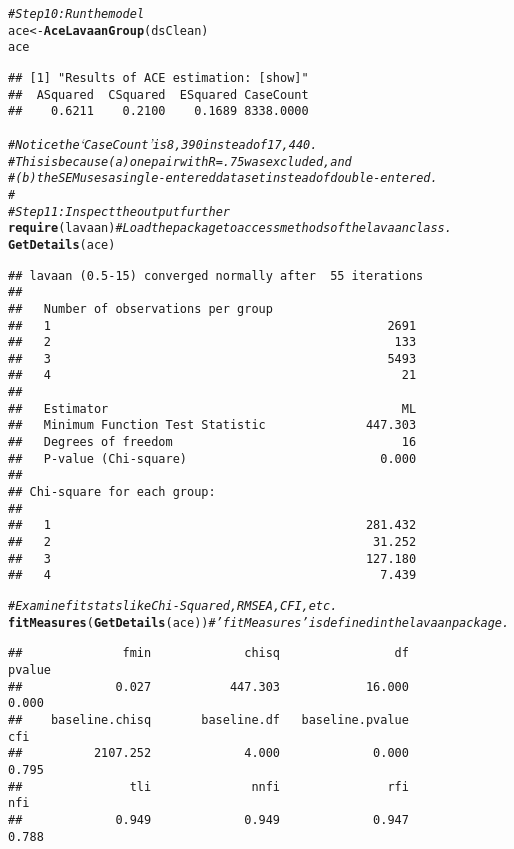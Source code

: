 \documentclass{article}\usepackage[]{graphicx}\usepackage[]{color}
\makeatletter
\newcommand{\hlcom}[1]{\textcolor[rgb]{0.678,0.584,0.686}{\textit{#1}}}%
\newcommand{\hlstd}[1]{\textcolor[rgb]{0.345,0.345,0.345}{#1}}%
\newcommand{\hlkwb}[1]{\textcolor[rgb]{0.69,0.353,0.396}{#1}}%
\newcommand{\hlkwd}[1]{\textcolor[rgb]{0.737,0.353,0.396}{\textbf{#1}}}%
\newenvironment{kframe}{%
 \def\at@end@of@kframe{}%
 \ifinner\ifhmode%
  \def\at@end@of@kframe{\end{minipage}}%
  \begin{minipage}{\columnwidth}%
 \fi\fi%
 \def\FrameCommand##1{\hskip\@totalleftmargin \hskip-\fboxsep
 \colorbox{shadecolor}{##1}\hskip-\fboxsep
     \hskip-\linewidth \hskip-\@totalleftmargin \hskip\columnwidth}%
 \MakeFramed {\advance\hsize-\width
   \@totalleftmargin\z@ \linewidth\hsize
   \@setminipage}}%
 {\par\unskip\endMakeFramed%
 \at@end@of@kframe}
\newenvironment{knitrout}{}{} %
\makeatother
\begin{document}
\begin{knitrout}
\begin{kframe}
\begin{alltt}
\hlcom{#Step 10: Run the model}
\hlstd{ace} \hlkwb{<-} \hlkwd{AceLavaanGroup}\hlstd{(dsClean)}
\hlstd{ace}
\end{alltt}
\begin{verbatim}
## [1] "Results of ACE estimation: [show]"
##  ASquared  CSquared  ESquared CaseCount 
##    0.6211    0.2100    0.1689 8338.0000
\end{verbatim}
\begin{alltt}
\hlcom{#Notice the `CaseCount' is 8,390 instead of 17,440.}
\hlcom{#  This is because (a) one pair with R=.75 was excluded, and}
\hlcom{#  (b) the SEM uses a single-entered dataset instead of double-entered.}
\hlcom{#}
\hlcom{#Step 11: Inspect the output further}
\hlkwd{require}\hlstd{(lavaan)} \hlcom{#Load the package to access methods of the lavaan class.}
\hlkwd{GetDetails}\hlstd{(ace)}
\end{alltt}
\begin{verbatim}
## lavaan (0.5-15) converged normally after  55 iterations
## 
##   Number of observations per group         
##   1                                               2691
##   2                                                133
##   3                                               5493
##   4                                                 21
## 
##   Estimator                                         ML
##   Minimum Function Test Statistic              447.303
##   Degrees of freedom                                16
##   P-value (Chi-square)                           0.000
## 
## Chi-square for each group:
## 
##   1                                            281.432
##   2                                             31.252
##   3                                            127.180
##   4                                              7.439
\end{verbatim}
\begin{alltt}
\hlcom{#Examine fit stats like Chi-Squared, RMSEA, CFI, etc.}
\hlkwd{fitMeasures}\hlstd{(}\hlkwd{GetDetails}\hlstd{(ace))} \hlcom{#'fitMeasures' is defined in the lavaan package.}
\end{alltt}
\begin{verbatim}
##              fmin             chisq                df            pvalue 
##             0.027           447.303            16.000             0.000 
##    baseline.chisq       baseline.df   baseline.pvalue               cfi 
##          2107.252             4.000             0.000             0.795 
##               tli              nnfi               rfi               nfi 
##             0.949             0.949             0.947             0.788 

\end{verbatim}
\end{kframe}
\end{knitrout}
\end{document}
